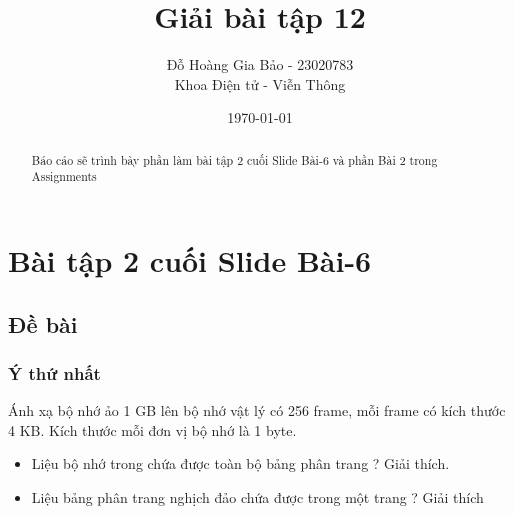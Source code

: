 \documentclass[12pt, letterpaper]{article}
\title{Giải bài tập 12}
\author{Đỗ Hoàng Gia Bảo - 23020783 \\ \small Khoa Điện tử - Viễn Thông}
\date{\today}
\begin{document}
\maketitle

\begin{abstract}
Báo cáo sẽ trình bày phần làm bài tập 2 cuối Slide Bài-6 và phần Bài 2 trong Assignments
\end{abstract}
\newpage
\tableofcontents

\newpage
{}
\setcounter{page}{3} %

\section{Bài tập 2 cuối Slide Bài-6}
\subsection{Đề bài}
\subsubsection{Ý thứ nhất}
Ánh xạ bộ nhớ ảo 1 GB lên bộ nhớ vật lý có 256 frame,
mỗi frame có kích thước 4 KB. Kích thước mỗi đơn vị bộ
nhớ là 1 byte.
\begin{itemize}
    \item Liệu bộ nhớ trong chứa được toàn bộ bảng phân trang ? Giải thích.
    \item Liệu bảng phân trang nghịch đảo chứa được trong một trang ? Giải thích
\end{itemize}
\end{document}
